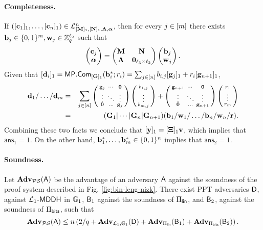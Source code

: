 \paragraph{Completeness.} If $([\mathbf{c}_1]_1,\ldots,
[\mathbf{{c}}_n]_1) \in\mathcal{L}_{[\mathbf{{M}}]_1,[\mathbf{{N}}]_1,\mathbf{{\Lambda}},{\boldsymbol \alpha}}^n$, then for every $j\in[{m}]$ there exists $\mathbf{{b}}_j\in\{0,1\}^{{m}},\mathbf{{w}}_j \in\mathbb{Z}_q^{{\ell_2}}$ such that 
$$
\left(\begin{matrix}
\mathbf{{c}}_j\\
{\boldsymbol \alpha}
\end{matrix}\right)
=
\begin{pmatrix}
\mathbf{{M}}       & \mathbf{{N}}\\
\mathbf{{\Lambda}} & \mathbf{{0}}_{{\ell_3}\times {\ell_2}}
\end{pmatrix}
\left(\begin{matrix}
    \mathbf{{b}}_j\\
    \mathbf{{w}}_j
\end{matrix}\right).
$$
Given that $[\mathbf{{d}}_i]_1 = \mathsf{MP}.\mathsf{Com}_{[\mathbf{{G}}]_1}(\mathbf{b}_i^*;r_i)=\sum_{j\in[n]}b_{i,j}[\mathbf{g}_j]_1+r_i[\mathbf{g}_{n+1}]_1$,
\begin{eqnarray*}
 \mathbf{d}_1/\ldots/\mathbf{d}_{m}
          &=&  {\sum_{j\in[n]}\left(\begin{smallmatrix}\mathbf{g}_j & \cdots & \mathbf{0}\\\vdots & \ddots & \vdots\\\mathbf{0}& \ldots & \mathbf{g}_j\end{smallmatrix}\right)\left(\begin{smallmatrix}b_{1,j}\\\vdots\\b_{{m},j}\end{smallmatrix}\right)+\left(\begin{smallmatrix}\mathbf{g}_{n+1} & \cdots & \mathbf{0}\\\vdots & \ddots & \vdots\\\mathbf{0}& \ldots & \mathbf{g}_{n+1}\end{smallmatrix}\right)\left(\begin{smallmatrix}r_1\\\vdots\\r_{m}\end{smallmatrix}\right)}\\
         &= & (\mathbf{{G}}_1|\cdots|\mathbf{{G}}_{n}|\mathbf{{G}}_{n+1})(\mathbf{b}_1/\mathbf{w}_1/\ldots/\mathbf{b}_n/\mathbf{w}_n/\mathbf{r}).
\end{eqnarray*}
Combining these two facts we conclude that
$[\mathbf{y}]_1 = [\mathbf{{\Xi}}]_1 \mathbf{v}$, which implies that $\mathsf{ans}_1=1$. On the other hand, $\mathbf{b}_1^*,\ldots,\mathbf{b}_{m}^*\in\{0,1\}^n$ implies that $\mathsf{ans}_2=1$.
  
\paragraph{Soundness.}

\begin{theorem}
Let $\mathbf{Adv}_{\mathcal{PS}}(\mathsf{A})$ be the advantage of an adversary $\mathsf{A}$ against the soundness of the proof system described in Fig. \ref{fig:bin-leng-nizk}. There exist PPT adversaries $\mathsf{D}$, against $\mathcal{L}_1\mbox{-}\mathsf{MDDH}$ in $\mathbb{G}_1$, $\mathsf{B}_1$ against the soundness of $\Pi_{\mathsf{lin}}$, and $\mathsf{B}_2$, against the soundness of $\Pi_{\mathsf{bits}}$, such that
$$
\mathbf{Adv}_{\mathcal{PS}}(\mathsf{A})\leq n\left(2/q + \mathbf{Adv}_{\mathcal{L}_1,\mathbb{G}_1}(\mathsf{D})+\mathbf{Adv}_{\Pi_{\mathsf{lin}}}(\mathsf{B}_1)+\mathbf{Adv}_{\Pi_{\mathsf{bits}}}(\mathsf{B}_2)\right).
$$
\end{theorem}

